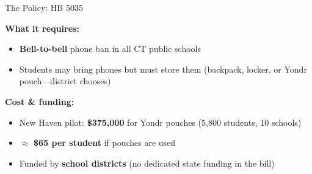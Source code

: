\documentclass[9pt,english,aspectratio=169]{beamer}
\begin{document}
\begin{frame}{The Policy: HB 5035}

  \textbf{What it requires:}
  \begin{itemize}
    \item \textbf{Bell-to-bell} phone ban in all CT public schools
    \item Students may bring phones but must store them (backpack, locker, or Yondr pouch---district chooses)
  \end{itemize}

  \vspace{0.4em}
  \textbf{Cost \& funding:}
  \begin{itemize}
    \item New Haven pilot: \textbf{\$375,000} for Yondr pouches (5,800 students, 10 schools)
    \item $\approx$ \textbf{\$65 per student} if pouches are used
    \item Funded by \textbf{school districts} (no dedicated state funding in the bill)
  \end{itemize}


\end{frame}
\end{document}

